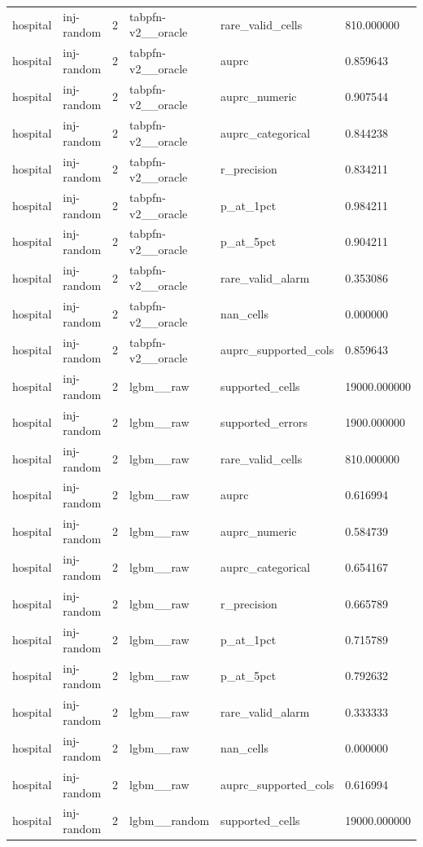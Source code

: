 \begin{tabular}{llllll}
hospital & inj-random & 2 & tabpfn-v2\_\_oracle & rare\_valid\_cells & 810.000000 \\
hospital & inj-random & 2 & tabpfn-v2\_\_oracle & auprc & 0.859643 \\
hospital & inj-random & 2 & tabpfn-v2\_\_oracle & auprc\_numeric & 0.907544 \\
hospital & inj-random & 2 & tabpfn-v2\_\_oracle & auprc\_categorical & 0.844238 \\
hospital & inj-random & 2 & tabpfn-v2\_\_oracle & r\_precision & 0.834211 \\
hospital & inj-random & 2 & tabpfn-v2\_\_oracle & p\_at\_1pct & 0.984211 \\
hospital & inj-random & 2 & tabpfn-v2\_\_oracle & p\_at\_5pct & 0.904211 \\
hospital & inj-random & 2 & tabpfn-v2\_\_oracle & rare\_valid\_alarm & 0.353086 \\
hospital & inj-random & 2 & tabpfn-v2\_\_oracle & nan\_cells & 0.000000 \\
hospital & inj-random & 2 & tabpfn-v2\_\_oracle & auprc\_supported\_cols & 0.859643 \\
hospital & inj-random & 2 & lgbm\_\_raw & supported\_cells & 19000.000000 \\
hospital & inj-random & 2 & lgbm\_\_raw & supported\_errors & 1900.000000 \\
hospital & inj-random & 2 & lgbm\_\_raw & rare\_valid\_cells & 810.000000 \\
hospital & inj-random & 2 & lgbm\_\_raw & auprc & 0.616994 \\
hospital & inj-random & 2 & lgbm\_\_raw & auprc\_numeric & 0.584739 \\
hospital & inj-random & 2 & lgbm\_\_raw & auprc\_categorical & 0.654167 \\
hospital & inj-random & 2 & lgbm\_\_raw & r\_precision & 0.665789 \\
hospital & inj-random & 2 & lgbm\_\_raw & p\_at\_1pct & 0.715789 \\
hospital & inj-random & 2 & lgbm\_\_raw & p\_at\_5pct & 0.792632 \\
hospital & inj-random & 2 & lgbm\_\_raw & rare\_valid\_alarm & 0.333333 \\
hospital & inj-random & 2 & lgbm\_\_raw & nan\_cells & 0.000000 \\
hospital & inj-random & 2 & lgbm\_\_raw & auprc\_supported\_cols & 0.616994 \\
hospital & inj-random & 2 & lgbm\_\_random & supported\_cells & 19000.000000 \\

\end{tabular}
